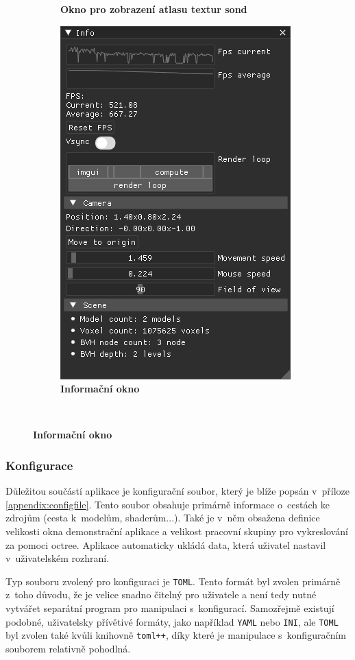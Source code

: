 \begin{figure}[H]
\begin{subfigure}[t]{.49\textwidth}
		\caption{\textbf{Okno pro zobrazení atlasu textur sond}}
		\label{fig:probe_ui}
	\end{subfigure}
		\begin{subfigure}[t]{1\textwidth}
			\centering
        	\includegraphics[scale=1]{images/dp_ui_info.png}
        	\caption{\textbf{Informační okno}}
        	\label{fig:info_ui}
	\end{subfigure}\\
	\captionsetup{justification=centering}
	\label{fig:UI}
\end{figure}


\subsubsection{Konfigurace}
Důležitou součástí aplikace je konfigurační soubor, který je blíže popsán v~příloze \ref{appendix:configfile}. Tento soubor obsahuje primárně informace o~cestách ke zdrojům (cesta k~modelům, shaderům...). Také je v~něm obsažena definice velikosti okna demonstrační aplikace a velikost pracovní skupiny pro vykreslování za pomoci octree. Aplikace automaticky ukládá data, která uživatel nastavil v~uživatelském rozhraní.

Typ souboru zvolený pro konfiguraci je \texttt{TOML}. Tento formát byl zvolen primárně z~toho důvodu, že je velice snadno čitelný pro uživatele a není tedy nutné vytvářet separátní program pro manipulaci s~konfigurací. Samozřejmě existují podobné, uživatelsky přívětivé formáty, jako například \texttt{YAML} nebo \texttt{INI}, ale \texttt{TOML} byl zvolen také kvůli knihovně \texttt{toml++}, díky které je manipulace s~konfiguračním souborem relativně pohodlná. 


